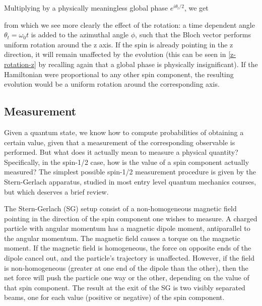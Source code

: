 \documentclass[12pt,a4paper,notitlepage]{report}
\begin{document}
Multiplying by a physically meaningless global phase $e^{i\theta_t/2}$, we get

from which we see more clearly the effect of the rotation: a time dependent angle $\theta_t = \omega_0 t$ is added to the azimuthal angle $\phi$, such that the Bloch vector performs uniform rotation around the z axis. If the spin is already pointing in the z direction, it will remain unaffected by the evolution (this can be seen in \eqref{z-rotation-z} by recalling again that a global phase is physically insignificant). If the Hamiltonian were proportional to any other spin component, the resulting evolution would be a uniform rotation around the corresponding axis.

\subsection{Measurement}

Given a quantum state, we know how to compute probabilities of obtaining a certain value, given that a measurement of the corresponding observable is performed. But what does it actually mean to measure a physical quantity? Specifically, in the spin-1/2 case, how is the value of a spin component actually measured? The simplest possible spin-1/2 measurement procedure is given by the Stern-Gerlach apparatus, studied in most entry level quantum mechanics courses, but which deserves a brief review.

The Stern-Gerlach (SG) setup consist of a non-homogeneous magnetic field pointing in the direction of the spin component one wishes to measure. A charged particle with angular momentum has a magnetic dipole moment, antiparallel to the angular momentum. The magnetic field causes a torque on the magnetic moment. If the magnetic field is homogeneous, the force on opposite ends of the dipole cancel out, and the particle's trajectory is unaffected. However, if the field is non-homogeneous (greater at one end of the dipole than the other), then the net force will push the particle one way or the other, depending on the value of that spin component. The result at the exit of the SG is two visibly separated beams, one for each value (positive or negative) of the spin component.
\end{document}
